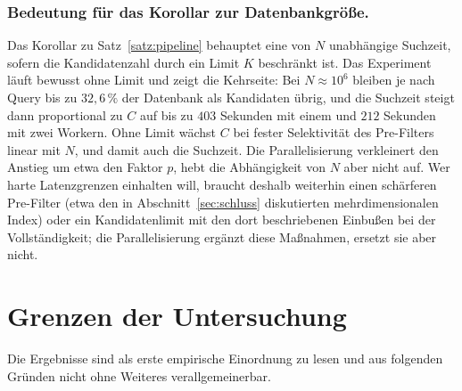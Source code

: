 \documentclass[a4paper,12pt, twoside]{report}
\theoremstyle{definition}
\begin{document}
\subsubsection{Bedeutung für das Korollar zur Datenbankgröße.} Das Korollar zu Satz~\ref{satz:pipeline} behauptet eine von $N$ unabhängige Suchzeit, sofern die Kandidatenzahl durch ein Limit $K$ beschränkt ist. Das Experiment läuft bewusst ohne Limit und zeigt die Kehrseite: Bei $N\approx 10^6$ bleiben je nach Query bis zu $32{,}6\,\%$ der Datenbank als Kandidaten übrig, und die Suchzeit steigt dann proportional zu $C$ auf bis zu $403$ Sekunden mit einem und $212$ Sekunden mit zwei Workern. Ohne Limit wächst $C$ bei fester Selektivität des Pre-Filters linear mit $N$, und damit auch die Suchzeit. Die Parallelisierung verkleinert den Anstieg um etwa den Faktor $p$, hebt die Abhängigkeit von $N$ aber nicht auf. Wer harte Latenzgrenzen einhalten will, braucht deshalb weiterhin einen schärferen Pre-Filter (etwa den in Abschnitt~\ref{sec:schluss} diskutierten mehrdimensionalen Index) oder ein Kandidatenlimit mit den dort beschriebenen Einbußen bei der Vollständigkeit; die Parallelisierung ergänzt diese Maßnahmen, ersetzt sie aber nicht.

\section{Grenzen der Untersuchung}
\label{sec:par_grenzen}

Die Ergebnisse sind als erste empirische Einordnung zu lesen und aus folgenden Gründen nicht ohne Weiteres verallgemeinerbar.
\end{document}
